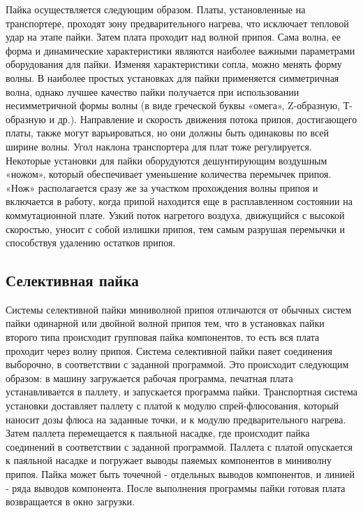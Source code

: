 \documentclass[unicode, 12pt, a4paper, oneside]{article}
\begin{document}
Пайка осуществляется следующим образом. Платы, установленные на транспортере, проходят зону предварительного нагрева, что исключает тепловой удар на этапе пайки. Затем плата проходит над волной припоя. Сама волна, ее форма и динамические характеристики являются наиболее важными параметрами оборудования для пайки. Изменяя характеристики сопла, можно менять форму волны. В наиболее простых установках для пайки применяется симметричная волна, однако лучшее качество пайки получается при использовании несимметричной формы волны (в виде греческой буквы «омега», Z-образную, Т-образную и др.). Направление и скорость движения потока припоя, достигающего платы, также могут варьироваться, но они должны быть одинаковы по всей ширине волны. Угол наклона транспортера для плат тоже регулируется. Некоторые установки для пайки оборудуются дешунтирующим воздушным «ножом», который обеспечивает уменьшение количества перемычек припоя. «Нож» располагается сразу же за участком прохождения волны припоя и включается в работу, когда припой находится еще в расплавленном состоянии на коммутационной плате. Узкий поток нагретого воздуха, движущийся с высокой скоростью, уносит с собой излишки припоя, тем самым разрушая перемычки и способствуя удалению остатков припоя.

\subsection*{Селективная пайка}

Системы селективной пайки миниволной припоя отличаются от обычных систем пайки одинарной или двойной волной припоя тем, что в установках пайки второго типа происходит групповая пайка компонентов, то есть вся плата проходит через волну припоя. Система селективной пайки паяет соединения выборочно, в соответствии с заданной программой. Это происходит следующим образом: в машину загружается рабочая программа, печатная плата устанавливается в паллету, и запускается программа пайки. Транспортная система установки доставляет паллету с платой к модулю спрей-флюсования, который наносит дозы флюса на заданные точки, и к модулю предварительного нагрева. Затем паллета перемещается к паяльной насадке, где происходит пайка соединений в соответствии с заданной программой. Паллета с платой опускается к паяльной насадке и погружает выводы паяемых компонентов в миниволну припоя. Пайка может быть точечной - отдельных выводов компонентов, и линией - ряда выводов компонента. После выполнения программы пайки готовая плата возвращается в окно загрузки.
\end{document}
